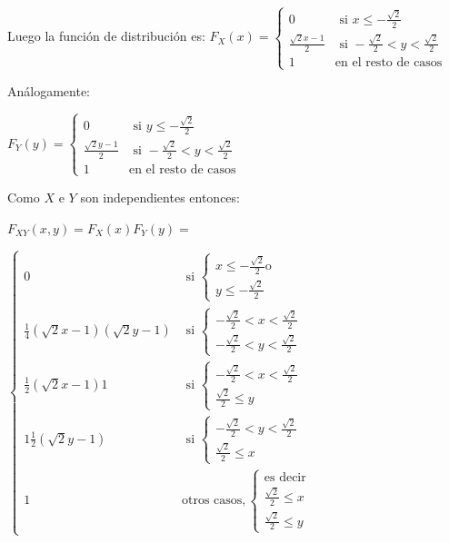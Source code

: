 \documentclass[12pt]{report}
\begin{document}
     Luego la función de distribución es:
    $F_{X}(x)=\left\{\begin{array}{ll}
      0 & \mbox{ si } x\leq -\frac{\sqrt{2}}{2}
      \\
     \frac{\sqrt{2} x
     -1}{2}& \mbox{ si } -\frac{\sqrt{2}}{2}<y<\frac{\sqrt{2}}{2} \\
     1 & \mbox{en el resto de casos}
      \end{array}\right.$

     Análogamente:

       $F_{Y}(y)=\left\{\begin{array}{ll}
      0 & \mbox{ si } y\leq -\frac{\sqrt{2}}{2}
      \\
      \frac{\sqrt{2} y
     -1}{2}& \mbox{ si } -\frac{\sqrt{2}}{2}<y<\frac{\sqrt{2}}{2} \\
     1 & \mbox{en el resto de casos}
      \end{array}\right.$

       Como $X$ e $Y$ son independientes entonces:


       $F_{XY}(x,y)=F_{X}(x) F_{Y}(y)=$


       $\left\{\begin{array}{ll}
      0 & \mbox{ si } \left\{\begin{array}{l}x\leq -\frac{\sqrt{2}}{2} \mbox{
      o } \\ y\leq -\frac{\sqrt{2}}{2}\end{array}\right.
      \\
      \frac{1}{4} (\sqrt{2} x -1)(\sqrt{2} y -1) &
      \mbox{ si }
      \left\{\begin{array}{l}-\frac{\sqrt{2}}{2}<x<\frac{\sqrt{2}}{2}\\
      -\frac{\sqrt{2}}{2}<y<\frac{\sqrt{2}}{2}\end{array}\right. \\
      \frac{1}{2} (\sqrt{2} x -1) 1 &
      \mbox{ si }
      \left\{\begin{array}{l}-\frac{\sqrt{2}}{2}<x<\frac{\sqrt{2}}{2}\\
     \frac{\sqrt{2}}{2}\leq y\end{array}\right.\\
      1  \frac{1}{2} (\sqrt{2} y -1)  &
      \mbox{ si }
      \left\{\begin{array}{l}-\frac{\sqrt{2}}{2}<y<\frac{\sqrt{2}}{2}\\
     \frac{\sqrt{2}}{2}\leq x\end{array}\right.\\
     1 & \mbox{otros casos},\left\{\begin{array}{l} \mbox{es decir
     }\\ \frac{\sqrt{2}}{2}\leq x
     \\ \frac{\sqrt{2}}{2}\leq y \end{array}\right.
      \end{array}\right.$
\end{document}
